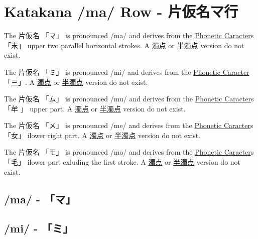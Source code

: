 \section{Katakana /ma/ Row - 片仮名マ行}\label{sec:KatakanaMaRow}


\label{letter:ma} The  片仮名 {「マ」} is pronounced  /ma/ and  derives from the
\hyperref[sec:PhoneticCharacter]{Phonetic Caracter}s {「末」} upper two parallel
horizontal strokes.  A \hyperref[sec:Dakuten]{濁点} or
\hyperref[sec:Handakuten]{半濁点} version do not exist.

\label{letter:mi} The  片仮名 {「ミ」} is pronounced  /mi/ and  derives from the
\hyperref[sec:PhoneticCharacter]{Phonetic Caracter} {「三」}.  A
\hyperref[sec:Dakuten]{濁点} or \hyperref[sec:Handakuten]{半濁点} version do
not exist.

\label{letter:mu} The  片仮名 {「ム」} is pronounced  /mu/ and  derives from the
\hyperref[sec:PhoneticCharacter]{Phonetic Caracter}s {「牟 」} upper part.  A
\hyperref[sec:Dakuten]{濁点} or \hyperref[sec:Handakuten]{半濁点} version do
not exist.

\newpage

\label{letter:me} The  片仮名 {「メ」} is pronounced  /me/ and  derives from the
\hyperref[sec:PhoneticCharacter]{Phonetic Caracter}s {「女」} ilower right part.  A
\hyperref[sec:Dakuten]{濁点} or \hyperref[sec:Handakuten]{半濁点} version do
not exist.



\label{letter:mo} The  片仮名 {「モ」} is pronounced  /mo/ and  derives from the
\hyperref[sec:PhoneticCharacter]{Phonetic Caracter}s {「毛」} ilower part exluding the
first stroke.  A \hyperref[sec:Dakuten]{濁点} or
\hyperref[sec:Handakuten]{半濁点} version do not exist.

\newpage

\subsection{/ma/ - 「マ」} \label{sec:KatakanaMa}

 

\subsection{/mi/ - 「ミ」} \label{sec:KatakanaMi}

